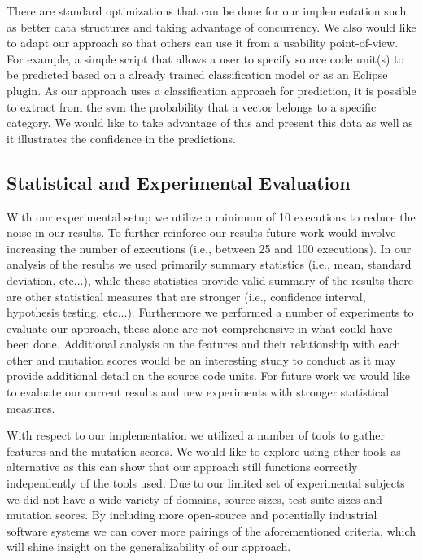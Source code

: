There are standard optimizations that can be done for our implementation such as better data structures and taking advantage of concurrency. We also would like to adapt our approach so that others can use it from a usability point-of-view. For example, a simple script that allows a user to specify source code unit(s) to be predicted based on a already trained classification model or as an Eclipse plugin. As our approach uses a classification approach for prediction, it is possible to extract from the \gls{svm} the probability that a vector belongs to a specific category. We would like to take advantage of this and present this data as well as it illustrates the confidence in the predictions.


\subsection{Statistical and Experimental Evaluation}
\label{subsec:conclusions_experimental_evaluation}
With our experimental setup we utilize a minimum of 10 executions to reduce the noise in our results. To further reinforce our results future work would involve increasing the number of executions (i.e., between 25 and 100 executions). In our analysis of the results we used primarily summary statistics (i.e., mean, standard deviation, etc...), while these statistics provide valid summary of the results there are other statistical measures that are stronger (i.e., confidence interval, hypothesis testing, etc...). Furthermore we performed a number of experiments to evaluate our approach, these alone are not comprehensive in what could have been done. Additional analysis on the features and their relationship with each other and mutation scores would be an interesting study to conduct as it may provide additional detail on the source code units. For future work we would like to evaluate our current results and new experiments with stronger statistical measures.

With respect to our implementation we utilized a number of tools to gather features and the mutation scores. We would like to explore using other tools as alternative as this can show that our approach still functions correctly independently of the tools used. Due to our limited set of experimental subjects we did not have a wide variety of domains, source sizes, test suite sizes and mutation scores. By including more open-source and potentially industrial software systems we can cover more pairings of the aforementioned criteria, which will shine insight on the generalizability of our approach.



